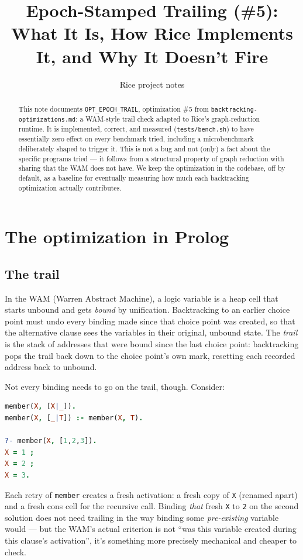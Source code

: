 \documentclass[11pt]{article}
\title{Epoch-Stamped Trailing (\#5):\\
What It Is, How Rice Implements It, and Why It Doesn't Fire}
\author{Rice project notes}
\date{}
\newcommand{\btomd}{\texttt{backtracking-\allowbreak optimizations.md}\xspace}
\begin{document}
\maketitle

\begin{abstract}
This note documents \texttt{OPT\_\allowbreak EPOCH\_\allowbreak TRAIL}, optimization \#5 from
\btomd: a WAM-style trail check adapted to
Rice's graph-reduction runtime. It is implemented, correct, and measured
(\texttt{tests/bench.sh}) to have essentially zero effect on every
benchmark tried, including a microbenchmark deliberately shaped to trigger
it. This is not a bug and not (only) a fact about the specific programs
tried --- it follows from a structural property of graph reduction with
sharing that the WAM does not have. We keep the optimization in the
codebase, off by default, as a baseline for eventually measuring how much
each backtracking optimization actually contributes.
\end{abstract}

\section{The optimization in Prolog}

\subsection{The trail}

In the WAM (Warren Abstract Machine), a logic variable is a heap cell that
starts unbound and gets \emph{bound} by unification. Backtracking to an
earlier choice point must undo every binding made since that choice point
was created, so that the alternative clause sees the variables in their
original, unbound state. The \emph{trail} is the stack of addresses that
were bound since the last choice point: backtracking pops the trail back
down to the choice point's own mark, resetting each recorded address back
to unbound.

Not every binding needs to go on the trail, though. Consider:

\begin{lstlisting}[language=Prolog]
member(X, [X|_]).
member(X, [_|T]) :- member(X, T).

?- member(X, [1,2,3]).
X = 1 ;
X = 2 ;
X = 3.
\end{lstlisting}

Each retry of \texttt{member} creates a fresh activation: a fresh copy of
\texttt{X} (renamed apart) and a fresh cons cell for the recursive call.
Binding \emph{that} fresh \texttt{X} to \texttt{2} on the second solution
does not need trailing in the way binding some \emph{pre-existing} variable
would --- but the WAM's actual criterion is not ``was this variable created
during this clause's activation'', it's something more precisely
mechanical and cheaper to check.
\end{document}
